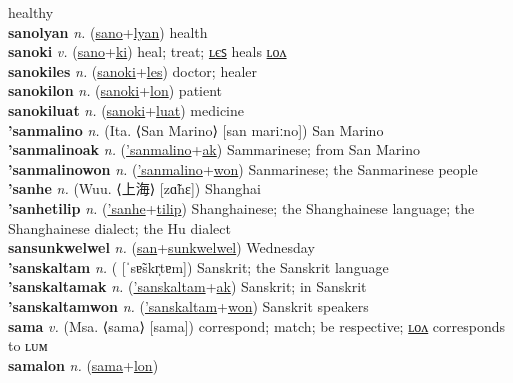 healthy \label{sanolon} \\
\textbf{sanolyan} \textit{n.} (\hyperref[sano]{sano}+\hyperref[lyan]{lyan})
health \label{sanolyan} \\
\textbf{sanoki} \textit{v.} (\hyperref[sano]{sano}+\hyperref[ki]{ki})
heal; treat; \hyperref[sanokiles]{ʟєꜱ} heals \hyperref[sanokilon]{ʟᴏᴧ} \label{sanoki} \\
\textbf{sanokiles} \textit{n.} (\hyperref[sanoki]{sanoki}+\hyperref[les]{les})
doctor; healer \label{sanokiles} \\
\textbf{sanokilon} \textit{n.} (\hyperref[sanoki]{sanoki}+\hyperref[lon]{lon})
patient \label{sanokilon} \\
\textbf{sanokiluat} \textit{n.} (\hyperref[sanoki]{sanoki}+\hyperref[luat]{luat})
medicine \label{sanokiluat} \\
\textbf{'sanmalino} \textit{n.} (Ita. ⟨San Marino⟩ [san mariːno])
San Marino \label{'sanmalino} \\
\textbf{'sanmalinoak} \textit{n.} (\hyperref['sanmalino]{'sanmalino}+\hyperref[ak]{ak})
Sammarinese; from San Marino \label{'sanmalinoak} \\
\textbf{'sanmalinowon} \textit{n.} (\hyperref['sanmalino]{'sanmalino}+\hyperref[won]{won})
Sanmarinese; the Sanmarinese people \label{'sanmalinowon} \\
\textbf{'sanhe} \textit{n.} (Wuu. ⟨上海⟩ [zɑ̃hɛ])
Shanghai \label{'sanhe} \\
\textbf{'sanhetilip} \textit{n.} (\hyperref['sanhe]{'sanhe}+\hyperref[tilip]{tilip})
Shanghainese; the Shanghainese language; the Shanghainese dialect; the Hu dialect \label{'sanhetilip} \\
\textbf{sansunkwelwel} \textit{n.} (\hyperref[san]{san}+\hyperref[sunkwelwel]{sunkwelwel})
Wednesday \label{sansunkwelwel} \\
\textbf{'sanskaltam} \textit{n.} ( [ˈsɐ̃skr̩tɐm])
Sanskrit; the Sanskrit language \label{'sanskaltam} \\
\textbf{'sanskaltamak} \textit{n.} (\hyperref['sanskaltam]{'sanskaltam}+\hyperref[ak]{ak})
Sanskrit; in Sanskrit \label{'sanskaltamak} \\
\textbf{'sanskaltamwon} \textit{n.} (\hyperref['sanskaltam]{'sanskaltam}+\hyperref[won]{won})
Sanskrit speakers \label{'sanskaltamwon} \\
\textbf{sama} \textit{v.} (Msa. ⟨sama⟩ [sama])
correspond; match; be respective; \hyperref[samalon]{ʟᴏᴧ} corresponds to ʟᴜᴍ \label{sama} \\
\textbf{samalon} \textit{n.} (\hyperref[sama]{sama}+\hyperref[lon]{lon})
